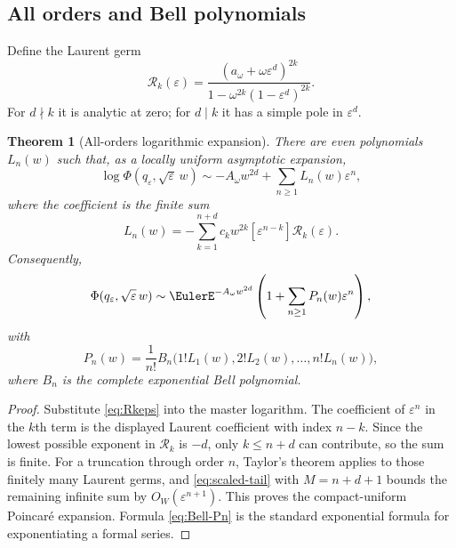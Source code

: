 \documentclass[11pt]{article}
\newtheorem{theorem}{Theorem}[section]
\theoremstyle{definition}
\newcommand{\eps}{\varepsilon}
\newcommand{\brak}[1]{\left[#1\right]}
\newcommand{\coeff}[2]{\brak{#1^{#2}}}
\begin{document}
\subsection{All orders and Bell polynomials}

Define the Laurent germ
\begin{equation}
 \mathcal R_k(\eps)
 =\frac{(a_\omega+\omega\eps^d)^{2k}}
 {1-\omega^{2k}(1-\eps^d)^{2k}}.
 \label{eq:Rkeps}
\end{equation}
For $d\nmid k$ it is analytic at zero; for $d\mid k$ it has a simple pole in $\eps^d$.

\begin{theorem}[All-orders logarithmic expansion]
There are even polynomials $L_n(w)$ such that, as a locally uniform asymptotic expansion,
\begin{equation}
 \log\Phi(q_\eps,\sqrt\eps\,w)
 \sim -A_\omega w^{2d}+\sum_{n\ge1}L_n(w)\eps^n,
 \label{eq:all-log}
\end{equation}
where the coefficient is the finite sum
\begin{equation}
 \boxed{
 L_n(w)=-\sum_{k=1}^{n+d}c_kw^{2k}
 \coeff{\eps}{n-k}\mathcal R_k(\eps).}
 \label{eq:Ln}
\end{equation}
Consequently,
\begin{equation}
 \Phi(q_\eps,\sqrt\eps\,w)
 \sim \EulerE^{-A_\omega w^{2d}}
 \left(1+\sum_{n\ge1}P_n(w)\eps^n\right),
 \label{eq:all-Phi}
\end{equation}
with
\begin{equation}
 \boxed{
 P_n(w)=\frac1{n!}
 B_n\bigl(1!L_1(w),2!L_2(w),\dots,n!L_n(w)\bigr),}
 \label{eq:Bell-Pn}
\end{equation}
where $B_n$ is the complete exponential Bell polynomial.
\end{theorem}

\begin{proof}
Substitute \cref{eq:Rkeps} into the master logarithm.  The coefficient of $\eps^n$ in the $k$th term is the displayed Laurent coefficient with index $n-k$.  Since the lowest possible exponent in $\mathcal R_k$ is $-d$, only $k\le n+d$ can contribute, so the sum is finite.  For a truncation through order $n$, Taylor's theorem applies to those finitely many Laurent germs, and \cref{eq:scaled-tail} with $M=n+d+1$ bounds the remaining infinite sum by $O_W(\eps^{n+1})$.  This proves the compact-uniform Poincar\'e expansion.  Formula \cref{eq:Bell-Pn} is the standard exponential formula for exponentiating a formal series.
\end{proof}
\end{document}
